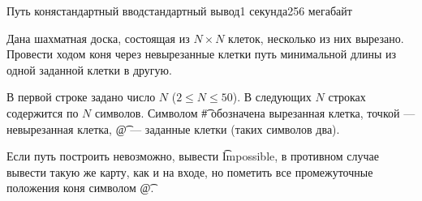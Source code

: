 \begin{problem}{Путь коня}{стандартный ввод}{стандартный вывод}{1 секунда}{256 мегабайт}

Дана шахматная доска, состоящая из $N \times N$ клеток, несколько из них вырезано. Провести ходом коня через невырезанные клетки путь минимальной длины из одной заданной клетки в другую.

\InputFile
В первой строке задано число $N$ ($2 \le N \le 50$). В следующих $N$ строках содержится по $N$ символов. Символом \t{\#} обозначена вырезанная клетка, точкой --- невырезанная клетка, \t{@} --- заданные клетки (таких символов два).

\OutputFile
Если путь построить невозможно, вывести \t{Impossible}, в противном случае вывести такую же карту, как и на входе, но пометить все промежуточные положения коня символом \t{@}.

\Examples

\begin{example}
%
%
%
\end{example}

\end{problem}

